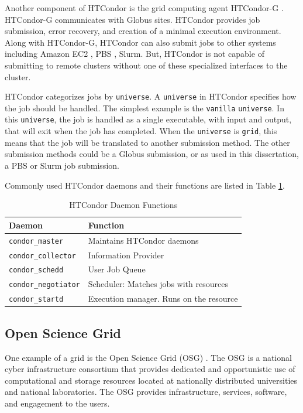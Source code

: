 Another component of HTCondor is the grid computing agent HTCondor-G \cite{frey2002condor}.  HTCondor-G communicates with Globus \cite{foster1997globus} sites.  HTCondor provides job submission, error recovery, and creation of a minimal execution environment.  Along with HTCondor-G, HTCondor can also submit jobs to other systems including Amazon EC2 \cite{amazonec2}, PBS \cite{pbstorque}, Slurm.  But, HTCondor is not capable of submitting to remote clusters without one of these specialized interfaces to the cluster.

HTCondor categorizes jobs by \texttt{universe}.  A \texttt{universe} in HTCondor specifies how the job should be handled.  The simplest example is the \texttt{vanilla} \texttt{universe}.  In this \texttt{universe}, the job is handled as a single executable, with input and output, that will exit when the job has completed.  When the \texttt{universe} is \texttt{grid}, this means that the job will be translated to another submission method.  The other submission methods could be a Globus submission, or as used in this dissertation, a PBS or Slurm job submission.

Commonly used HTCondor daemons and their functions are listed in Table \ref{table:condordaemons}.

\begin{table}[h!t]
	\centering
	\begin{tabular}{| l | l |}
		\hline
		Daemon & Function \\
		\hline \hline
		\texttt{condor\_master} & Maintains HTCondor daemons   \\ \hline
		\texttt{condor\_collector} & Information Provider \\ \hline
		\texttt{condor\_schedd} & User Job Queue \\ \hline
		\texttt{condor\_negotiator} & Scheduler: Matches jobs with resources \\ \hline
		\texttt{condor\_startd} & Execution manager.  Runs on the resource \\ \hline
	\end{tabular}
	\caption{HTCondor Daemon Functions} \label{table:condordaemons}
\end{table}

\subsection{Open Science Grid}
One example of a grid is the Open Science Grid (OSG) \cite{pordes2007open}. The OSG is a national cyber infrastructure consortium that provides dedicated and opportunistic use of computational and storage resources located at nationally distributed universities and national laboratories. The OSG provides infrastructure, services, software, and engagement to the users.  

